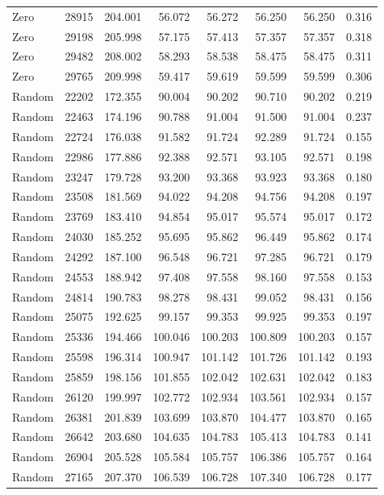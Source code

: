 \begin{longtable}{lrrrrrrr}
Zero & 28915 & 204.001 & 56.072 & 56.272 & 56.250 & 56.250 & 0.316\\
Zero & 29198 & 205.998 & 57.175 & 57.413 & 57.357 & 57.357 & 0.318\\
Zero & 29482 & 208.002 & 58.293 & 58.538 & 58.475 & 58.475 & 0.311\\
Zero & 29765 & 209.998 & 59.417 & 59.619 & 59.599 & 59.599 & 0.306\\
Random & 22202 & 172.355 & 90.004 & 90.202 & 90.710 & 90.202 & 0.219\\
Random & 22463 & 174.196 & 90.788 & 91.004 & 91.500 & 91.004 & 0.237\\
Random & 22724 & 176.038 & 91.582 & 91.724 & 92.289 & 91.724 & 0.155\\
Random & 22986 & 177.886 & 92.388 & 92.571 & 93.105 & 92.571 & 0.198\\
Random & 23247 & 179.728 & 93.200 & 93.368 & 93.923 & 93.368 & 0.180\\
Random & 23508 & 181.569 & 94.022 & 94.208 & 94.756 & 94.208 & 0.197\\
Random & 23769 & 183.410 & 94.854 & 95.017 & 95.574 & 95.017 & 0.172\\
Random & 24030 & 185.252 & 95.695 & 95.862 & 96.449 & 95.862 & 0.174\\
Random & 24292 & 187.100 & 96.548 & 96.721 & 97.285 & 96.721 & 0.179\\
Random & 24553 & 188.942 & 97.408 & 97.558 & 98.160 & 97.558 & 0.153\\
Random & 24814 & 190.783 & 98.278 & 98.431 & 99.052 & 98.431 & 0.156\\
Random & 25075 & 192.625 & 99.157 & 99.353 & 99.925 & 99.353 & 0.197\\
Random & 25336 & 194.466 & 100.046 & 100.203 & 100.809 & 100.203 & 0.157\\
Random & 25598 & 196.314 & 100.947 & 101.142 & 101.726 & 101.142 & 0.193\\
Random & 25859 & 198.156 & 101.855 & 102.042 & 102.631 & 102.042 & 0.183\\
Random & 26120 & 199.997 & 102.772 & 102.934 & 103.561 & 102.934 & 0.157\\
Random & 26381 & 201.839 & 103.699 & 103.870 & 104.477 & 103.870 & 0.165\\
Random & 26642 & 203.680 & 104.635 & 104.783 & 105.413 & 104.783 & 0.141\\
Random & 26904 & 205.528 & 105.584 & 105.757 & 106.386 & 105.757 & 0.164\\
Random & 27165 & 207.370 & 106.539 & 106.728 & 107.340 & 106.728 & 0.177\\

\end{longtable}
